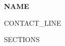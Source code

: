\documentclass[10pt,a4paper]{article}
\begin{document}

\begin{center}

{\LARGE \textbf{{{NAME}}}}

\vspace{4pt}

{{CONTACT_LINE}}

\end{center}

{{SECTIONS}}
\end{document}
